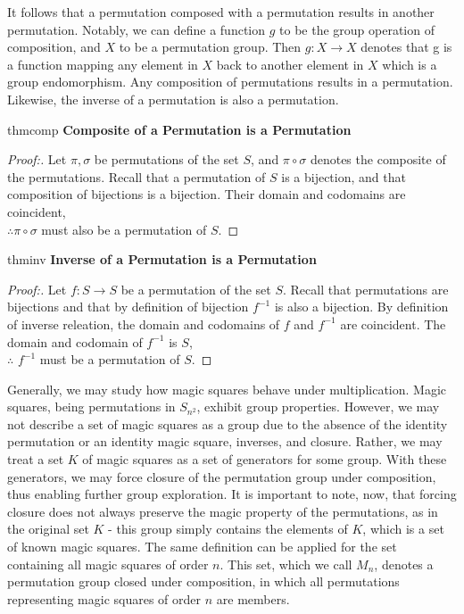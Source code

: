 \documentclass[12pt]{report}
\begin{document}
\par It follows that a permutation composed with a permutation results in another permutation.
Notably, we can define a function $g$ to be the group operation of composition, and $X$ to be a
permutation group. Then $g:X\rightarrow X$ denotes that g is a function mapping any element in $X$
back to another element in $X$ which is a group endomorphism. Any composition of permutations
results in a permutation. Likewise, the inverse of a permutation is also a permutation.

\singlespacing{}
\begin{thmbox}{}{thmcomp}
  \textbf{Composite of a Permutation is a Permutation}
  \begin{proof}[Proof:]
    Let $\pi,\sigma$ be permutations of the set $S$, and $\pi\circ\sigma$ denotes the composite of
    the permutations. Recall that a permutation of $S$ is a bijection, and that composition of
    bijections is a bijection. Their domain and codomains are coincident,\\ $\therefore
      \pi\circ\sigma$
    must also be a permutation of $S$.
  \end{proof}
\end{thmbox}
\doublespacing{}

\singlespacing{}
\begin{thmbox}{}{thminv}
  \textbf{Inverse of a Permutation is a Permutation}
  \begin{proof}[Proof:]
    Let $f : S \rightarrow S$ be a permutation of the set $S$. Recall that permutations are
    bijections and that by definition of bijection $f^{-1}$ is also a bijection. By definition of
    inverse releation, the domain and codomains of $f$ and $f^{-1}$ are coincident. The domain and
    codomain of $f^{-1}$ is $S$,\\ $\therefore$ $f^{-1}$ must be a permutation of $S$.
  \end{proof}
\end{thmbox}
\doublespacing{}

\par Generally, we may study how magic squares behave under multiplication. Magic squares, being
permutations in $S_{n^2}$, exhibit group properties. However, we may not describe a set of magic
squares as a group due to the absence of the identity permutation or an identity magic square,
inverses, and closure. Rather, we may treat a set $K$ of magic squares as a set of generators for
some group. With these generators, we may force closure of the permutation group under composition,
thus enabling further group exploration. It is important to note, now, that forcing closure does
not always preserve the magic property of the permutations, as in the original set $K$ \hyphen{}
this group simply contains the elements of $K$, which is a set of known magic squares. The same
definition can be applied for the set containing all magic squares of order $n$. This set, which we
call $M_n$, denotes a permutation group closed under composition, in which all permutations
representing magic squares of order $n$ are members.
\end{document}
